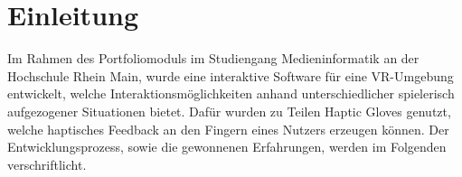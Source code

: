 \chapter{Einleitung}
Im Rahmen des Portfoliomoduls im Studiengang Medieninformatik an der Hochschule Rhein Main, wurde eine interaktive Software für eine VR-Umgebung entwickelt, welche Interaktionsmöglichkeiten anhand unterschiedlicher spielerisch aufgezogener Situationen bietet. Dafür wurden zu Teilen \dq Haptic Gloves \dq genutzt, welche haptisches Feedback an den Fingern eines Nutzers erzeugen können. Der Entwicklungsprozess, sowie die gewonnenen Erfahrungen, werden im Folgenden verschriftlicht.